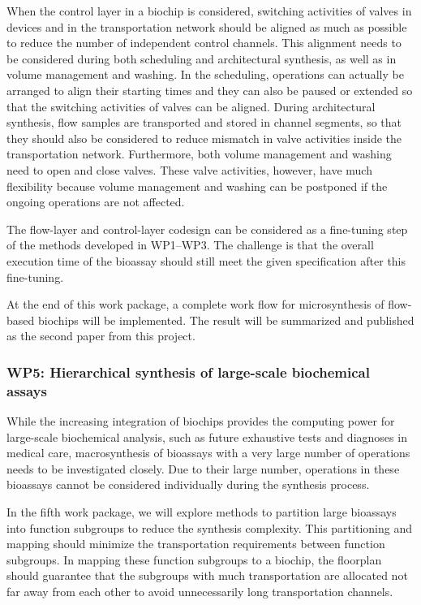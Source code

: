 When the control layer in a biochip is considered, switching activities of
valves in devices and in the transportation network should be aligned as much
as possible to reduce the number of independent control channels. This
alignment needs to be considered during both scheduling and architectural
synthesis, as well as in volume management and washing. 
In the scheduling, operations can actually be arranged to align
their starting times and they can also be paused or extended
so that
the switching activities of valves can be aligned.
During architectural synthesis, flow samples are transported and 
stored in channel segments, so that 
they should also be considered to reduce mismatch in valve activities inside
the transportation network.
Furthermore, both volume management and 
washing need to open and close valves. These valve activities, however, have much
flexibility because volume management and washing can be postponed if the ongoing
operations are not affected.

The flow-layer and control-layer codesign can be considered as a fine-tuning
step of the methods developed in WP1--WP3. The challenge is that the
overall execution time of the bioassay should still meet the given specification
after this fine-tuning. 

At the end of this work package, a complete work flow for microsynthesis
of flow-based biochips will be implemented. The result will be summarized and
published as the second paper from this project.


\subsubsection{WP5: Hierarchical synthesis of large-scale biochemical assays} 

While the increasing integration of biochips provides the computing power for
large-scale biochemical analysis, such as future exhaustive tests and
diagnoses in medical care, macrosynthesis of bioassays with a very large number 
of operations needs to be investigated closely.   
Due to their large number, operations in these bioassays cannot be considered
individually during the synthesis process.

In the fifth work package, we will explore methods to partition large bioassays
into function subgroups to reduce the synthesis complexity.
This partitioning
and mapping should minimize the transportation requirements between 
function subgroups. In mapping these
function subgroups to a biochip, the floorplan should guarantee that the 
subgroups with much transportation are allocated not
far away from each other to avoid unnecessarily long transportation 
channels. %

